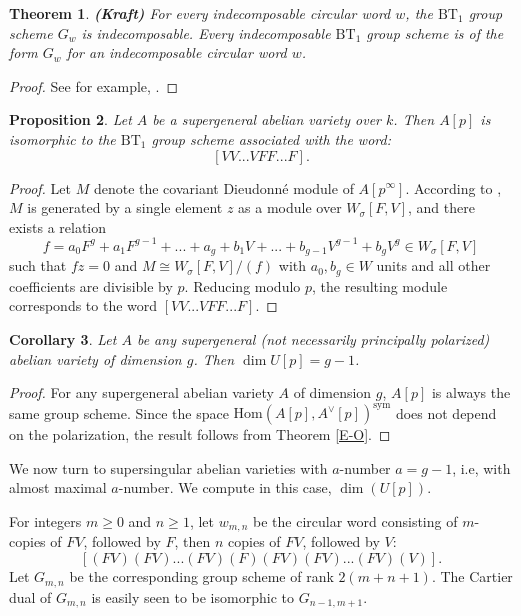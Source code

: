 \documentclass[a4paper,12pt,twoside]{report}
\newtheorem{theorem}{Theorem}[section]
\newtheorem{proposition}[theorem]{Proposition}
\newtheorem{corollary}[theorem]{Corollary}
\newcommand{\Hom}{\mathrm{Hom}}
\newcommand{\sym}{\mathrm{sym}}
\newcommand{\BT}{\mathrm{BT}}
\begin{document}
\begin{theorem}{\bf (Kraft)}
    For every indecomposable circular word $w$, the $\BT_1$ group scheme $G_w$ is indecomposable. 
    Every indecomposable $\BT_1$ group scheme is of the form $G_w$ for an indecomposable circular word $w$. 
\end{theorem}

\begin{proof}
    See for example, \cite[Theorem 5.3]{Oo3}. 
\end{proof}

\begin{proposition}
    Let $A$ be a supergeneral abelian variety over $k$. Then $A[p]$ is isomorphic to the $\BT_1$ group scheme associated with the word:
    \[[VV...VFF...F].\]
\end{proposition}

\begin{proof}
    Let $M$ denote the covariant Dieudonné module of $A[p^\infty]$. 
    According to \cite[Lemma 5.7]{LNV}, $M$ is generated by a single element $z$ as a module over $W_\sigma[F,V]$, 
    and there exists a relation
    \[f=a_0F^g+a_1F^{g-1}+...+a_g+b_1V+...+b_{g-1}V^{g-1}+b_gV^g\in W_\sigma[F,V]\]
    such that $fz=0$ and $M\cong W_{\sigma}[F,V]/(f)$ with $a_0,b_g\in W$ units 
    and all other coefficients are divisible by $p$. 
    Reducing modulo $p$, the resulting module corresponds to the word $[VV...VFF...F]$. 
\end{proof}

\begin{corollary}\label{supergeneraldimUp}
    Let $A$ be any supergeneral (not necessarily principally polarized) abelian variety of dimension $g$. 
    Then $\dim U[p]=g-1$. 
\end{corollary}

\begin{proof}
    For any supergeneral abelian variety $A$ of dimension $g$, 
    $A[p]$ is always the same group scheme. 
    Since the space $\Hom(A[p],A^\vee[p])^\sym$ does not depend on the polarization, 
    the result follows from Theorem \ref{E-O}. 
\end{proof}

We now turn to supersingular abelian varieties with $a$-number $a=g-1$, i.e, 
with almost maximal \(a\)-number.  
We compute in this case, $\dim(U[p])$. 

For integers $m\geqslant 0$ and $n\geqslant 1$, let $w_{m,n}$ be the circular word consisting of $m$-copies of $FV$, followed by 
$F$, then $n$ copies of $FV$, followed by $V$:
\[[(FV)(FV)...(FV)(F)(FV)(FV)...(FV)(V)].\]
Let $G_{m,n}$ be the corresponding group scheme of rank $2(m+n+1)$. 
The Cartier dual of $G_{m,n}$ is easily seen to be isomorphic to $G_{n-1,m+1}$. 
\end{document}
